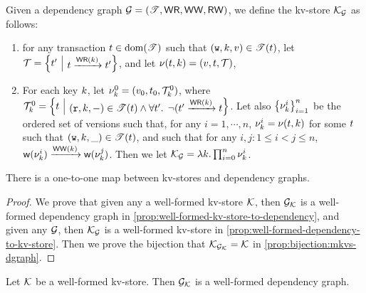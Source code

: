 \begin{definition}
\label{def:dependency-to-kv-store}
Given a dependency graph $\mathcal{G} = (\mathscr{T}, \mathsf{WR}, \mathsf{WW}, \mathsf{RW})$, we define the kv-store $\mathcal{K}_{\mathcal{G}}$ as follows: 
\begin{enumerate}
\item for any transaction $t \in \operatorname{dom}(\mathscr{T})$ such that $(\textnormal{\texttt w}, k, v) \in \mathscr{T}(t)$, 
    let $\txidset = \Set{ \txid' }[ \txid \toEDGE{\WR(\key)} \txid']$, and let $\nu(t, k) = (v, t, \mathcal{T})$, 
\item For each key $k$, let $\nu_{k}^{0} = (v_0, t_0, \mathcal{T}_k^{0})$, where $\txidset_{k}^{0} = \Set{ \txid }[ (\otR, \key, \stub) \in 
\TtoOp{T}(\txid) \land \fora{ \txid' } \neg( \txid' \toEDGE{\WR(\key)} \txid ]$. 
Let also $\Set{ \ver_{\key}^{i} }_{i = 1}^{n}$ be the ordered set of versions such that, for any 
$i=1,\cdots,n$, $\nu_{k}^{i} = \nu(t, k)$ for some $t$ such that $(\textnormal{\texttt w}, k, \_) \in \mathscr{T}(t)$, 
and such that for any $i, j: 1 \leq i < j \leq n$, $\wtOf(\ver_{\key}^{i}) \toEDGE{\WW(\key)} \wtOf(\ver_{\key}^{j})$. 
Then we let $\mathcal{K}_{\mathcal{G}}= \lambda k. \prod_{i=0}^{n} \nu_{k}^{i}$.
\end{enumerate}
\end{definition}

\begin{theorem}
\label{thm:kv2graph}
There is a one-to-one map between kv-stores and dependency graphs.
\end{theorem}
\begin{proof}
    We prove that given any a well-formed kv-store \( \mathcal{K} \), then $\mathcal{G}_{\mathcal{K}}$ is a well-formed dependency graph in \cref{prop:well-formed-kv-store-to-dependency},
    and given any \( \mathcal{G} \), then  $\mathcal{K}_{\mathcal{G}}$ is a well-formed kv-store in \cref{prop:well-formed-dependency-to-kv-store}.
    Then we prove the bijection that $\mathcal{K}_{\mathcal{G}_{\mathcal{K}}} = \mathcal{K}$ in \cref{prop:bijection:mkvs-dgraph}.
\end{proof}



\begin{proposition}
\label{prop:well-formed-kv-store-to-dependency}
Let $\mathcal{K}$ be a well-formed kv-store. Then $\mathcal{G}_{\mathcal{K}}$ is a well-formed dependency graph.
\end{proposition}

